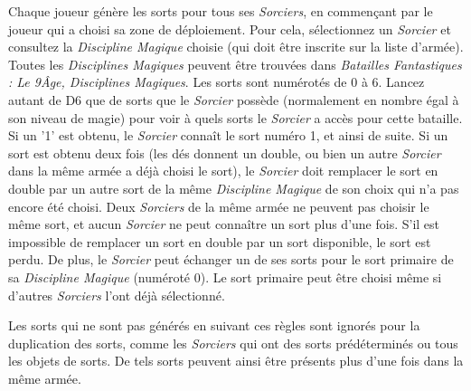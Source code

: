 Chaque joueur génère les sorts pour tous ses \emph{Sorciers}, en commençant par le joueur qui a choisi sa zone de déploiement. Pour cela, sélectionnez un \emph{Sorcier} et consultez la \emph{Discipline Magique} choisie (qui doit être inscrite sur la liste d'armée). Toutes les \emph{Disciplines Magiques} peuvent être trouvées dans \emph{Batailles Fantastiques : Le 9\ieme Âge, Disciplines Magiques}. Les sorts sont numérotés de 0 à 6. Lancez autant de D6 que de sorts que le \emph{Sorcier} possède (normalement en nombre égal à son niveau de magie) pour voir à quels sorts le \emph{Sorcier} a accès pour cette bataille. Si un '1' est obtenu, le \emph{Sorcier} connaît le sort numéro 1, et ainsi de suite. Si un sort est obtenu deux fois (les dés donnent un double, ou bien un autre \emph{Sorcier} dans la même armée a déjà choisi le sort), le \emph{Sorcier} doit remplacer le sort en double par un autre sort de la même \emph{Discipline Magique} de son choix qui n'a pas encore été choisi. Deux \emph{Sorciers} de la même armée ne peuvent pas choisir le même sort, et aucun \emph{Sorcier} ne peut connaître un sort plus d'une fois. S'il est impossible de remplacer un sort en double par un sort disponible, le sort est perdu. De plus, le \emph{Sorcier} peut échanger un de ses sorts pour le sort primaire de sa \emph{Discipline Magique} (numéroté 0). Le sort primaire peut être choisi même si d'autres \emph{Sorciers} l'ont déjà sélectionné.

Les sorts qui ne sont pas générés en suivant ces règles sont ignorés pour la duplication des sorts, comme les \emph{Sorciers} qui ont des sorts prédéterminés ou tous les objets de sorts. De tels sorts peuvent ainsi être présents plus d'une fois dans la même armée.
